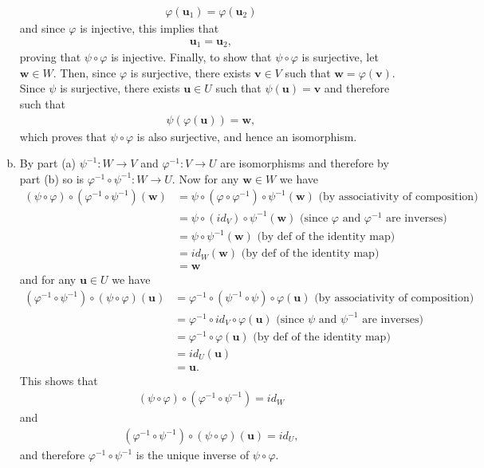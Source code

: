 \documentclass[12pt,letterpaper,reqno]{article}
\numberwithin{equation}{section}
\newcommand{\bu}{\mathbf{u}}
\newcommand{\fixme}[1]{{\color{orange}{[#1]}}}
\begin{document}
\begin{pf}
\begin{enumerate}[(a)]
\begin{align*}
		\varphi(\mathbf{u}_1)=\varphi(\mathbf{u}_2)
	\end{align*}
	and since $\varphi$ is injective, this implies that 
	\begin{align*}
		\mathbf{u}_1=\mathbf{u}_2,
	\end{align*}
	proving that $\psi \circ \varphi$ is injective. Finally, to show that $\psi \circ \varphi$ is surjective, let $\mathbf{w} \in W$. Then, since $\varphi$ is surjective, there exists $\mathbf{v} \in V$ such that $\mathbf{w}=\varphi(\mathbf{v})$. Since $\psi$ is surjective, there exists $\mathbf{u} \in U$ such that $\psi(\mathbf{u})=\mathbf{v}$ and therefore such that 
	\begin{align*}
		\psi(\varphi(\mathbf{u}))=\mathbf{w},
	\end{align*}
	which proves that $\psi \circ \varphi$ is also surjective, and hence an isomorphism.
	\item By part (a) $\psi^{-1}:W \to V$ and $\varphi^{-1}: V \to U$ are isomorphisms and therefore by part (b) so is $\varphi^{-1} \circ \psi^{-1}:W \to U$. Now for any $\mathbf{w} \in W$ we have
	\begin{align*}
	(\psi \circ \varphi) \circ (\varphi^{-1} \circ \psi^{-1})(\mathbf{w})&=\psi \circ (\varphi \circ \varphi^{-1}) \circ \psi^{-1}(\mathbf{w}) \text{ (by associativity of composition)} \\
	&=\psi \circ (id_V) \circ \psi^{-1}(\mathbf{w}) \text{ (since $\varphi$ and $\varphi^{-1}$ are inverses)} \\
	&=\psi \circ \psi^{-1}(\mathbf{w}) \text{ (by def of the identity map)}\\
	&=id_W(\mathbf{w}) \text{ (by def of the identity map)}\\
	&=\mathbf{w}
	\end{align*}
and for any $\bu \in U$ we have
\begin{align*}
	 (\varphi^{-1} \circ \psi^{-1}) \circ (\psi \circ \varphi)(\bu)&=\varphi^{-1} \circ (\psi^{-1} \circ \psi) \circ \varphi(\bu) \text{ (by associativity of composition)}\\
	 &=\varphi^{-1} \circ id_V \circ \varphi(\bu) \text{ (since $\psi$ and $\psi^{-1}$ are inverses)}\\
	 &=\varphi^{-1} \circ \varphi(\bu) \text{ (by def of the identity map)}\\
	 &=id_U(\bu) \\
	 &=\bu.
\end{align*}
This shows that 
\begin{align*}
	(\psi \circ \varphi) \circ (\varphi^{-1} \circ \psi^{-1})=id_W
\end{align*}
and 
\begin{align*}
	(\varphi^{-1} \circ \psi^{-1}) \circ (\psi \circ \varphi)(\bu)=id_U,
\end{align*}
and therefore $\varphi^{-1} \circ \psi^{-1}$
is the unique inverse of $\psi \circ \varphi$.
\end{enumerate}	
\end{pf}
\fixme{Need to show that composition of functions is associative and that inverses are unique, or at least link to this when we do it in a later section.}
\end{document}
